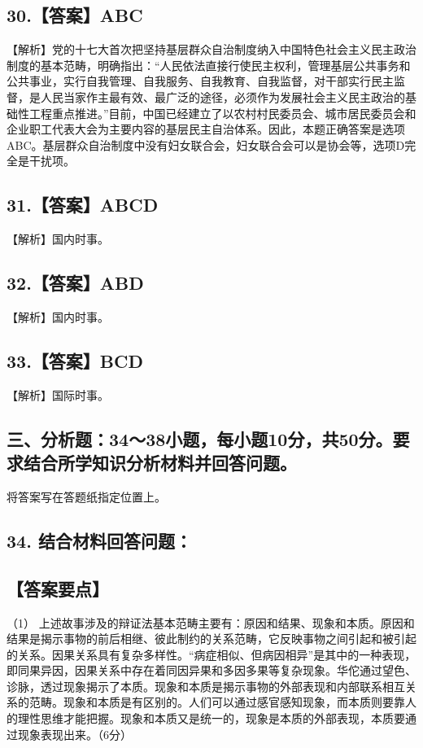 \documentclass[UTF8,11pt]{ctexart}
\begin{document}
\subsection*{30.【答案】ABC}

【解析】党的十七大首次把坚持基层群众自治制度纳入中国特色社会主义民主政治制度的基本范畴，明确指出：“人民依法直接行使民主权利，管理基层公共事务和公共事业，实行自我管理、自我服务、自我教育、自我监督，对干部实行民主监督，是人民当家作主最有效、最广泛的途径，必须作为发展社会主义民主政治的基础性工程重点推进。”目前，中国已经建立了以农村村民委员会、城市居民委员会和企业职工代表大会为主要内容的基层民主自治体系。因此，本题正确答案是选项 ABC。基层群众自治制度中没有妇女联合会，妇女联合会可以是协会等，选项D完全是干扰项。


\subsection*{31.【答案】ABCD}

【解析】国内时事。


\subsection*{32.【答案】ABD}

【解析】国内时事。


\subsection*{33.【答案】BCD}

【解析】国际时事。


\subsection*{三、分析题：34～38小题，每小题10分，共50分。要求结合所学知识分析材料并回答问题。}

将答案写在答题纸指定位置上。


\subsection*{34. 结合材料回答问题：}

\subsection*{【答案要点】}

（1） 上述故事涉及的辩证法基本范畴主要有：原因和结果、现象和本质。原因和结果是揭示事物的前后相继、彼此制约的关系范畴，它反映事物之间引起和被引起的关系。因果关系具有复杂多样性。“病症相似、但病因相异”是其中的一种表现，即同果异因，因果关系中存在着同因异果和多因多果等复杂现象。华佗通过望色、诊脉，透过现象揭示了本质。现象和本质是揭示事物的外部表现和内部联系相互关系的范畴。现象和本质是有区别的。人们可以通过感官感知现象，而本质则要靠人的理性思维才能把握。现象和本质又是统一的，现象是本质的外部表现，本质要通过现象表现出来。（6分）
\end{document}
